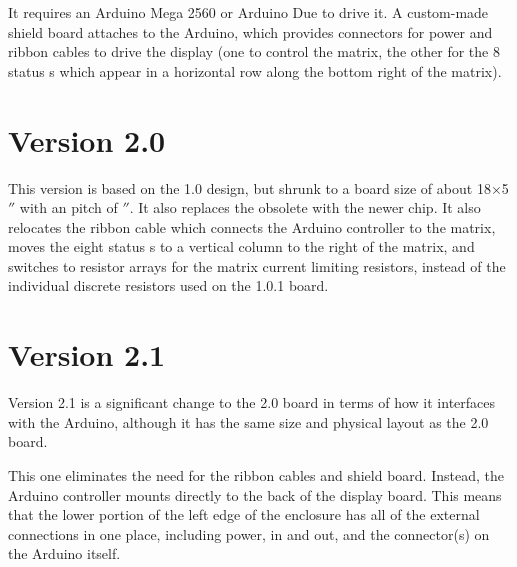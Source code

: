 It requires an Arduino Mega 2560 or Arduino Due to drive it. A custom-made shield board attaches to
the Arduino, which provides connectors for power and ribbon cables to drive the display (one to control
the matrix, the other for the 8 status s which appear in a horizontal row along the bottom
right of the matrix).


\section{Version 2.0}
This version is based on the 1.0 design, but shrunk to a board size of about 18$\times$5$''$
with an  pitch of $''$. It also replaces the obsolete  with the newer  chip.
It also relocates the ribbon cable which connects the Arduino controller to the  matrix, moves the
eight status s to a vertical column to the right of the matrix, and switches to resistor arrays
for the matrix current limiting resistors, instead of the individual discrete resistors used on the 1.0.1 board.

\section{Version 2.1}
Version 2.1 is a significant change to the 2.0 board in terms of how it interfaces with the Arduino, although it has the same size and physical
layout as the 2.0 board.

This one eliminates the need for the ribbon cables and shield board. Instead, the Arduino controller mounts
directly to the back of the display board. This means that the lower portion of the left edge of the enclosure
has all of the external connections in one place, including power,  in and out, and the 
 connector(s) on the Arduino itself.

